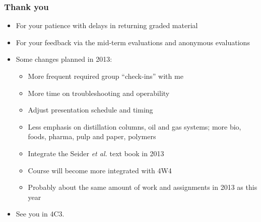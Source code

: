 \begin{frame}\frametitle{Thank you}
	\begin{itemize}
		\item	For your patience with delays in returning graded material
		\item	For your feedback via the mid-term evaluations and anonymous evaluations
		\item	Some changes planned in 2013:
		\begin{itemize}
			\item	More frequent required group ``check-ins'' with me
			\item	More time on troubleshooting and operability
			\item	Adjust presentation schedule and timing
			\item	Less emphasis on distillation columns, oil and gas systems; more bio, foods, pharma, pulp and paper, polymers
			\item	Integrate the Seider \emph{et al.} text book in 2013
			\item	Course will become more integrated with 4W4
			\item	Probably about the same amount of work and assignments in 2013 as this year
		\end{itemize}
		
		\vspace{48pt}
		\pause
		\item	{See you in 4C3.}
	\end{itemize}
\end{frame}

\begin{frame}\frametitle{}
	\begin{exampleblock}{}
		\begin{center}\huge {}
		\end{center}
	\end{exampleblock}
\end{frame}